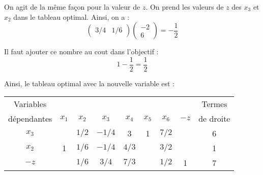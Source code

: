 On agit de la même façon pour la valeur de $z$. On prend les valeurs de $z$ des $x_3$ et $x_2$ dans le tableau optimal. Ainsi, on a :
\[
\begin{pmatrix}
3/4 & 1/6 
\end{pmatrix}
\begin{pmatrix}
-2 \\
6
\end{pmatrix}
=
-\frac{1}{2}
\]

Il faut ajouter ce nombre au cout dans l’objectif :
\[1 -\frac{1}{2} = \frac{1}{2}\]

Ainsi, le tableau optimal avec la nouvelle variable est :

\begin{center}
	\begin{tabular}{|c|ccccccc|c|}
		\hline
		 Variables  &         &         &         &         &         &         &      &  Termes   \\
		dépendantes & $x_{1}$ & $x_{2}$ & $x_{3}$ & $x_{4}$ & $x_{5}$ & $x_{6}$ & $-z$ & de droite \\ \hline
		  $x_{3}$   &         &  $1/2$  & $- 1/4$ &    3    &    1    &  $7/2$  &      &     6     \\
		  $x_{2}$   &    1    &  $1/6$  & $- 1/4$ &  $4/3$  &         &  $3/2$  &      &     1     \\ \hline
		   $-z$     &         &  $1/6$  &  $3/4$  &  $7/3$  &         &  $1/2$  &  1   &     7     \\ \hline
	\end{tabular}
\end{center}